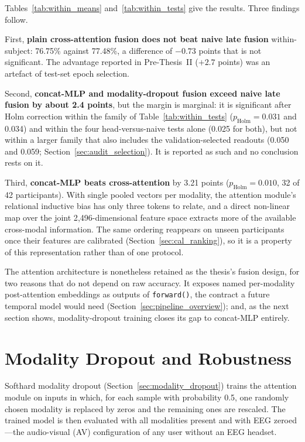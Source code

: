 Tables~\ref{tab:within_means} and~\ref{tab:within_tests} give the results. Three findings follow.

First, \textbf{plain cross-attention fusion does not beat naive late fusion} within-subject: 76.75\% against 77.48\%, a difference of $-0.73$ points that is not significant. The advantage reported in Pre-Thesis~II ($+2.7$ points) was an artefact of test-set epoch selection.

Second, \textbf{concat-MLP and modality-dropout fusion exceed naive late fusion by about 2.4 points}, but the margin is marginal: it is significant after Holm correction within the family of Table~\ref{tab:within_tests} ($p_{\mathrm{Holm}} = 0.031$ and 0.034) and within the four head-versus-naive tests alone (0.025 for both), but not within a larger family that also includes the validation-selected readouts (0.050 and 0.059; Section~\ref{sec:audit_selection}). It is reported as such and no conclusion rests on it.

Third, \textbf{concat-MLP beats cross-attention} by 3.21 points ($p_{\mathrm{Holm}} = 0.010$, 32 of 42 participants). With single pooled vectors per modality, the attention module's relational inductive bias has only three tokens to relate, and a direct non-linear map over the joint 2{,}496-dimensional feature space extracts more of the available cross-modal information. The same ordering reappears on unseen participants once their features are calibrated (Section~\ref{sec:cal_ranking}), so it is a property of this representation rather than of one protocol.

The attention architecture is nonetheless retained as the thesis's fusion design, for two reasons that do not depend on raw accuracy. It exposes named per-modality post-attention embeddings as outputs of \texttt{forward()}, the contract a future temporal model would need (Section~\ref{sec:pipeline_overview}); and, as the next section shows, modality-dropout training closes its gap to concat-MLP entirely.

\section{Modality Dropout and Robustness}
\label{sec:modality_dropout_results}

Softhard modality dropout (Section~\ref{sec:modality_dropout}) trains the attention module on inputs in which, for each sample with probability 0.5, one randomly chosen modality is replaced by zeros and the remaining ones are rescaled. The trained model is then evaluated with all modalities present and with EEG zeroed---the audio-visual (AV) configuration of any user without an EEG headset.

